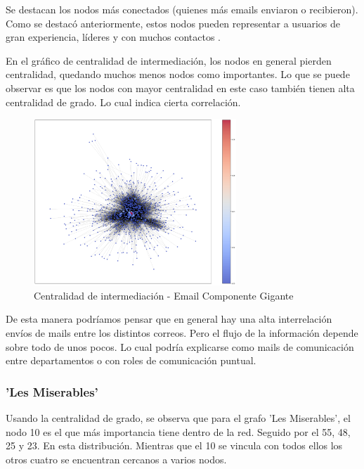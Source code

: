 \documentclass[conference]{IEEEtran}
\begin{document}
Se destacan los nodos más conectados (quienes más emails enviaron o recibieron). Como se destacó anteriormente, estos nodos pueden representar a usuarios de gran experiencia, líderes y con muchos contactos .


En el gráfico de centralidad de intermediación, los nodos en general pierden centralidad, quedando muchos menos nodos como importantes. Lo que se puede observar es que los nodos con mayor centralidad en este caso también tienen alta centralidad de grado. Lo cual indica cierta correlación.

\begin{figure}[h]
    \centering
    \includegraphics[width=3in]{img/centralidad_email_betweness_sping.png}
    \caption{Centralidad de intermediación - Email Componente Gigante}
    \label{fig:betweneess_email}
\end{figure}

De esta manera podríamos pensar que en general hay una alta interrelación envíos de mails entre los distintos correos. Pero el flujo de la información depende sobre todo de unos pocos. Lo cual podría explicarse como mails de comunicación entre departamentos o con roles de comunicación puntual. 

\subsubsection{'Les Miserables'}

Usando la centralidad de grado, se observa que para el grafo 'Les Miserables', el nodo 10 es el que más importancia tiene dentro de la red. Seguido por el 55, 48, 25 y 23. En esta distribución. Mientras que el 10 se vincula con todos ellos los otros cuatro se encuentran cercanos a varios nodos. 
\end{document}
